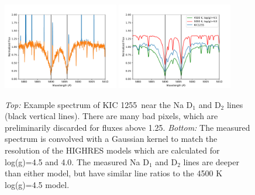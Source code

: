 \documentclass[twocolumn]{aastex61}
\newcommand{\shStar}{KIC 1255}
\begin{document}
\begin{figure}
\begin{centering}
\includegraphics[width=0.45\textwidth]{images/subaru/Na_D_spec_interp.pdf}
\includegraphics[width=0.45\textwidth]{images/subaru/Na_D_spec.pdf}
\caption{{\it Top:} Example spectrum of \shStar\ near the Na D$_1$ and D$_2$ lines (black vertical lines).
There are many bad pixels, which are preliminarily discarded for fluxes above 1.25.
{\it Bottom:} The measured spectrum is convolved with a Gaussian kernel to match the resolution of the HIGHRES models which are calculated for log(g)=4.5 and 4.0.
The measured Na D$_1$ and D$_2$ lines are deeper than either model, but have similar line ratios to the 4500 K log(g)=4.5 model.}\label{fig:naDlines}
\end{centering}
\end{figure}
\end{document}
